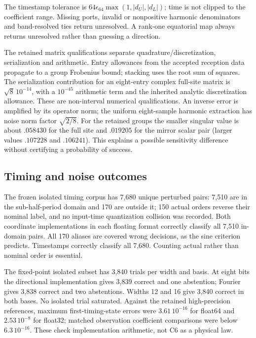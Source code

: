 The timestamp tolerance is $64\epsilon_{64}\max(1,|d_U|,|d_L|)$; time is not clipped to the coefficient range. Missing ports, invalid or nonpositive harmonic denominators and band-resolved ties return unresolved. A rank-one equatorial map always returns unresolved rather than guessing a direction.

The retained matrix qualifications separate quadrature/discretization, serialization and arithmetic. Entry allowances from the accepted reception data propagate to a group Frobenius bound; stacking uses the root sum of squares. The serialization contribution for an eight-entry complex full-site matrix is $\sqrt8\,10^{-14}$, with a $10^{-45}$ arithmetic term and the inherited analytic discretization allowance. These are non-interval numerical qualifications. An inverse error is amplified by its operator norm; the uniform eight-sample harmonic extraction has noise norm factor $\sqrt{2/8}$. For the retained groups the smaller singular value is about $.058430$ for the full site and $.019205$ for the mirror scalar pair (larger values $.107228$ and $.106241$). This explains a possible sensitivity difference without certifying a probability of success.

\subsection{Timing and noise outcomes}
The frozen isolated timing corpus has 7,680 unique perturbed pairs: 7,510 are in the sub-half-period domain and 170 are outside it; 150 actual orders reverse their nominal label, and no input-time quantization collision was recorded. Both coordinate implementations in each floating format correctly classify all 7,510 in-domain pairs. All 170 aliases are covered wrong decisions, as the sine criterion predicts. Timestamps correctly classify all 7,680. Counting actual rather than nominal order is essential.

The fixed-point isolated subset has 3,840 trials per width and basis. At eight bits the directional implementation gives 3,839 correct and one abstention; Fourier gives 3,838 correct and two abstentions. Widths 12 and 16 give 3,840 correct in both bases. No isolated trial saturated. Against the retained high-precision references, maximum first-timing-state errors were $3.61\,10^{-16}$ for float64 and $2.53\,10^{-8}$ for float32; matched observation coefficient comparisons were below $6.3\,10^{-16}$. These check implementation arithmetic, not C6 as a physical law.


